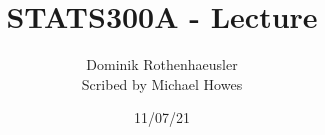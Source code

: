 




\title{STATS300A - Lecture }
\author{Dominik Rothenhaeusler\\ Scribed by Michael Howes}
\date{11/07/21}

\pagestyle{fancy}
\fancyhf{}


\maketitle
\tableofcontents
